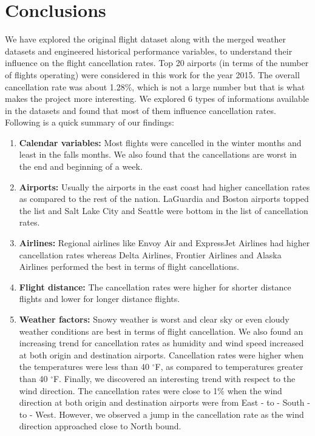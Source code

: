 \documentclass[12pt]{article}
\begin{document}
\section{Conclusions}
We have explored the original flight dataset along with the merged weather datasets and engineered historical performance variables, to understand their influence on the flight cancellation rates. Top 20 airports (in terms of the number of flights operating) were considered in this work for the year 2015. The overall cancellation rate was about 1.28$\%$, which is not a large number but that is what makes the project more interesting. We explored 6 types of informations available in the datasets and found that most of them influence cancellation rates. Following is a quick summary of our findings:
\begin{enumerate}
\itemsep0em
\item \textbf{Calendar variables:} Most flights were cancelled in the winter months and least in the falls months. We also found that the cancellations are worst in the end and beginning of a week.
\item \textbf{Airports:} Usually the airports in the east coast had higher cancellation rates as compared to the rest of the nation. LaGuardia and Boston airports topped the list and Salt Lake City and Seattle were bottom in the list of cancellation rates. 
\item \textbf{Airlines:} Regional airlines like Envoy Air and ExpressJet Airlines had higher cancellation rates whereas Delta Airlines, Frontier Airlines and Alaska Airlines performed the best in terms of flight cancellations.
\item \textbf{Flight distance:} The cancellation rates were higher for shorter distance flights and lower for longer distance flights.  
\item \textbf{Weather factors:} Snowy weather is worst and clear sky or even cloudy weather conditions are best in terms of flight cancellation. We also found an increasing trend for cancellation rates as humidity and wind speed increased at both origin and destination airports. Cancellation rates were higher when the  temperatures were less than 40 $^\circ$F, as compared to temperatures greater than 40 $^\circ$F. Finally, we discovered an interesting trend with respect to the wind direction. The cancellation rates were close to 1$\%$ when the wind direction at both origin and destination airports were from East - to - South - to - West. However, we observed a jump in the cancellation rate as the wind direction approached close to North bound. 

\end{enumerate}
\end{document}
